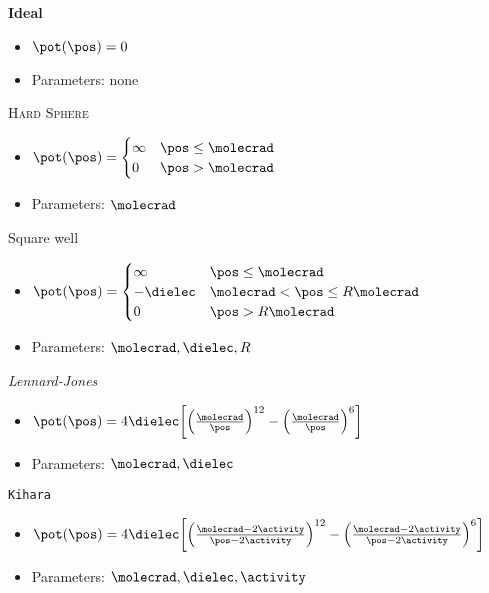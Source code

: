\begin{mdframed}
    \vspace*{\baselineskip}
    \indent

	\textbf{Ideal}
    \begin{itemize}[label={--}]
	\item $\pot(\pos) = 0 $ 
    \item Parameters: none
    \end{itemize}
    
	\textsc{Hard Sphere}
\begin{itemize}[label={--}]
	\item $\pot(\pos)=\begin{cases}
                    \infty &\pos \leq \molecrad\\
                    0 &\pos > \molecrad\\
                \end{cases}$
	\item Parameters: $\molecrad$   
\end{itemize}
   
	\textsf{Square well}
\begin{itemize}[label=]
	\item $\pot(\pos)=\begin{cases}
             \infty &\pos \leq \molecrad\\
             -\dielec &\molecrad < \pos \leq R\molecrad\\
                    0 & \pos > R\molecrad
                \end{cases}$
	\item Parameters: $\molecrad, \dielec, R$
\end{itemize}

    \textit{Lennard-Jones}
    \begin{itemize}[label=]
	\item $\pot(\pos) = 4\dielec\bigg[\Big(\frac{\molecrad}{\pos}\Big)^{12}-\Big(\frac{\molecrad}{\pos}\Big)^6\bigg] $
	\item Parameters: $\molecrad, \dielec$
\end{itemize}
  
    \texttt{Kihara}
    \begin{itemize}[label={---}]
	\item $\pot(\pos) = 4\dielec\bigg[\Big(\frac{\molecrad-2\activity}{\pos-2\activity}\Big)^{12}-\Big(\frac{\molecrad-2\activity}{\pos-2\activity}\Big)^6\bigg] $
    \item Parameters: $\molecrad, \dielec, \activity$
\end{itemize}


\end{mdframed}
